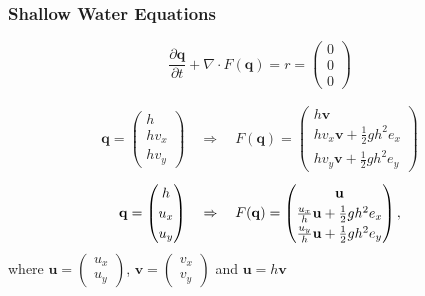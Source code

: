 \documentclass{beamer}
\newcommand{\pd}[2]{\dfrac{\partial #1}{\partial #2}}
\begin{document}
\begin{frame}
  \frametitle{Shallow Water Equations}
  \vspace{-.3cm}
  \begin{equation}
    \label{eq:shallow-water-basic}
    \pd{\mathbf{q}}{t} + \nabla \cdot F(\mathbf{q}) = r = \begin{pmatrix}
      0 \\ 0\\ 0
    \end{pmatrix}
  \end{equation}

  \begin{eqnarray*}
    \mathbf{q} =
    \begin{pmatrix}
      h \\ h v_x \\ h v_y
    \end{pmatrix} \quad \Rightarrow \quad F(\mathbf{q}) =
    \begin{pmatrix}
      h \mathbf{v} \\ h v_x \mathbf{v} + \frac{1}{2} g h^2 e_x \\ h
      v_y \mathbf{v} + \frac{1}{2} g h^2 e_y
    \end{pmatrix}
  \end{eqnarray*}
  \begin{eqnarray*}
    \mathbf{q} =
    \begin{pmatrix}
      h \\ u_x \\ u_y
    \end{pmatrix} \quad \Rightarrow \quad F(\mathbf{q}) =
    {
      \renewcommand{\arraystretch}{1.2}
      \begin{pmatrix}
        \mathbf{u} \\ \frac{u_x}{h} \mathbf{u} + \frac{1}{2} g h^2 e_x \\ \frac{u_y}{h} \mathbf{u}+
        \frac{1}{2} g h^2 e_y
      \end{pmatrix},
    }
  \end{eqnarray*}
  where $\mathbf{u}=
  \begin{pmatrix}
    u_x \\ u_y
  \end{pmatrix}$, $\mathbf{v} =
  \begin{pmatrix}
    v_x \\ v_y
  \end{pmatrix}$ and $\mathbf{u} = h\mathbf{v}$
\end{frame}
\end{document}
